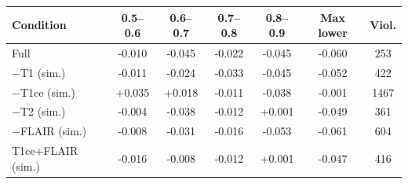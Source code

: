 \begin{tabular}{lcccccc}
\toprule
Condition & 0.5--0.6 & 0.6--0.7 & 0.7--0.8 & 0.8--0.9 & Max lower & Viol. \\
\midrule
Full & -0.010 & -0.045 & -0.022 & -0.045 & -0.060 & 253 \\
$-$T1 (sim.) & -0.011 & -0.024 & -0.033 & -0.045 & -0.052 & 422 \\
$-$T1ce (sim.) & +0.035 & +0.018 & -0.011 & -0.038 & -0.001 & 1467 \\
$-$T2 (sim.) & -0.004 & -0.038 & -0.012 & +0.001 & -0.049 & 361 \\
$-$FLAIR (sim.) & -0.008 & -0.031 & -0.016 & -0.053 & -0.061 & 604 \\
T1ce+FLAIR (sim.) & -0.016 & -0.008 & -0.012 & +0.001 & -0.047 & 416 \\
\bottomrule
\end{tabular}
